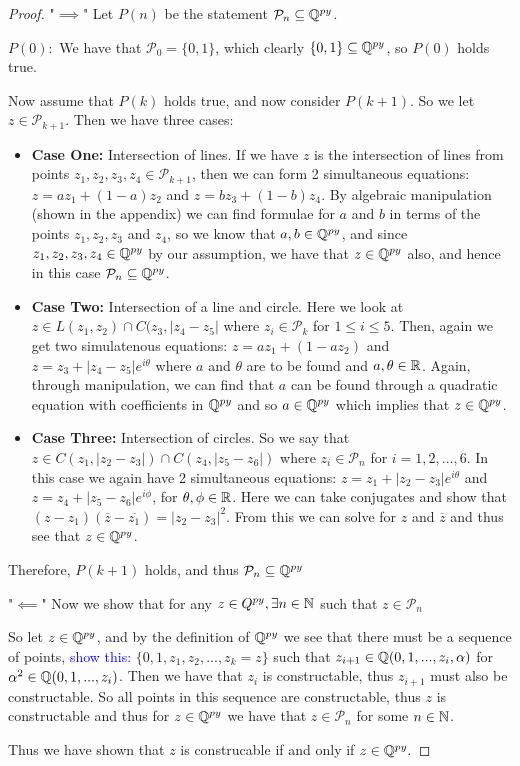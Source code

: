 \begin{proof}
    "$\implies$" Let $P(n)$ be the statement $\mathcal{P}_n \subseteq \mathbb Q^{py}$.

    $P(0):$ We have that $\mathcal{P}_0 = \{0,1\}$, which clearly $\{0,1\}\subseteq\mathbb Q^{py}$, so $P(0)$ holds true.

    Now assume that $P(k)$ holds true, and now consider $P(k+1)$. So we let $z \in \mathcal{P}_{k+1}$. Then we have three cases:
    \begin{itemize}
        \item \textbf{Case One:} Intersection of lines. If we have $z$ is the intersection of lines from points $z_1, z_2, z_3, z_4 \in \mathcal{P}_{k+1}$, then we can form 2 simultaneous equations:
        $z = az_1+(1-a)z_2$ and $z = bz_3+(1-b)z_4$. By algebraic manipulation (shown in the appendix) we can find formulae for $a$ and $b$ in terms of the points $z_1,z_2,z_3$ and $z_4$, so we know that $a,b \in \mathbb Q^{py}$, and since $z_1,z_2,z_3,z_4\in \mathbb Q^{py}$ by our assumption, we have that $z\in \mathbb Q^{py}$ also, and hence in this case $\mathcal{P}_n \subseteq \mathbb Q^{py}$.
        \item \textbf{Case Two:} Intersection of a line and circle. Here we look at $z \in L(z_1,z_2)\cap C(z_3,|z_4-z_5|$ where $z_i \in \mathcal{P}_k$ for $1\leq i \leq 5$. Then, again we get two simulatenous equations:
        $z=az_1+(1-az_2)$ and $z=z_3+|z_4-z_5|e^{i\theta}$ where $a$ and $\theta$ are to be found and $a,\theta \in \mathbb R$. Again, through manipulation, we can find that $a$ can be found through a quadratic equation with coefficients in $\mathbb Q^{py}$ and so $a \in \mathbb Q^{py}$ which implies that $z\in \mathbb Q^{py}$.
        \item \textbf{Case Three:} Intersection of circles. So we say that $z \in C(z_1,|z_2-z_3|) \cap C(z_4,|z_5-z_6|)$ where $z_i \in \mathcal{P}_n$ for $i = 1,2,...,6$. In this case we again have 2 simultaneous equations: $z=z_1+|z_2-z_3|e^{i\theta}$ and $z=z_4+|z_5-z_6|e^{i\phi}$, for $\theta,\phi \in \mathbb R$. Here we can take conjugates and show that $(z-z_1)(\overline{z}-\overline{z_1})=|z_2-z_3|^2$. From this we can solve for $z$ and $\overline{z}$ and thus see that $z \in \mathbb Q^{py}$.
    \end{itemize}
Therefore, $P(k+1)$ holds, and thus $\mathcal{P}_n \subseteq \mathbb Q^{py}$

"$\impliedby$" Now we show that for any $z \in Q^{py}, \exists n \in \mathbb N$ such that $z \in \mathcal{P}_n$

So let $z \in \mathbb Q^{py}$, and by the definition of $\mathbb Q^{py}$ we see that there must be a sequence of points, \textcolor{blue}{show this:} $\{0,1,z_1,z_2,...,z_k=z\}$ such that $z_{i+1} \in \mathbb Q(0,1,...,z_i,\alpha)$ for $\alpha^2 \in \mathbb Q(0,1,...,z_i)$. Then we have that $z_i$ is constructable, thus $z_{i+1}$ must also be constructable. So all points in this sequence are constructable, thus $z$ is constructable and thus for $z \in \mathbb Q^{py}$ we have that $z \in \mathcal{P}_n$ for some $n \in \mathbb N$.

Thus we have shown that $z$ is construcable if and only if $z\in \mathbb Q^{py}.$

\end{proof}



